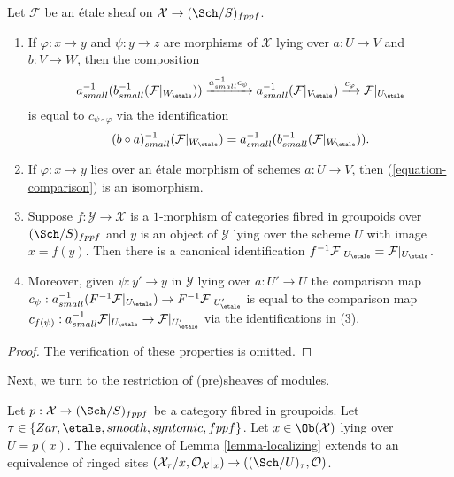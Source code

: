 \begin{lemma}
\label{lemma-comparison}
Let $\mathcal{F}$ be an \'etale sheaf on $\mathcal{X} \to (\Sch/S)_{fppf}$.
\begin{enumerate}
\item If $\varphi : x \to y$ and $\psi : y \to z$
are morphisms of $\mathcal{X}$ lying over $a : U \to V$ and
$b : V \to W$, then the composition
$$
a_{small}^{-1}(b_{small}^{-1} (\mathcal{F}|_{W_\etale}))
\xrightarrow{a_{small}^{-1}c_\psi}
a_{small}^{-1}(\mathcal{F}|_{V_\etale})
\xrightarrow{c_\varphi}
\mathcal{F}|_{U_\etale}
$$
is equal to $c_{\psi \circ \varphi}$ via the identification
$$
(b \circ a)_{small}^{-1}(\mathcal{F}|_{W_\etale}) =
a_{small}^{-1}(b_{small}^{-1} (\mathcal{F}|_{W_\etale})).
$$
\item If $\varphi : x \to y$ lies over an \'etale morphism of schemes
$a : U \to V$, then (\ref{equation-comparison}) is an isomorphism.
\item Suppose $f : \mathcal{Y} \to \mathcal{X}$ is a $1$-morphism of
categories fibred in groupoids over $(\Sch/S)_{fppf}$ and $y$ is
an object of $\mathcal{Y}$ lying over the scheme $U$ with image
$x = f(y)$. Then there is a canonical identification
$f^{-1}\mathcal{F}|_{U_\etale} = \mathcal{F}|_{U_\etale}$.
\item Moreover, given $\psi : y' \to y$ in $\mathcal{Y}$ lying over
$a : U' \to U$ the comparison map
$c_\psi : a_{small}^{-1}(F^{-1}\mathcal{F}|_{U_\etale}) \to
F^{-1}\mathcal{F}|_{U'_\etale}$ is equal to the
comparison map $c_{f(\psi)} : a_{small}^{-1}\mathcal{F}|_{U_\etale}
\to \mathcal{F}|_{U'_\etale}$ via the identifications in (3).
\end{enumerate}
\end{lemma}

\begin{proof}
The verification of these properties is omitted.
\end{proof}

\noindent
Next, we turn to the restriction of (pre)sheaves of modules.

\begin{lemma}
\label{lemma-localizing-structure-sheaf}
Let $p : \mathcal{X} \to (\Sch/S)_{fppf}$ be a category fibred
in groupoids. Let $\tau \in \{Zar, \etale, smooth, syntomic, fppf\}$.
Let $x \in \Ob(\mathcal{X})$ lying over $U = p(x)$.
The equivalence of
Lemma \ref{lemma-localizing}
extends to an equivalence of ringed sites
$(\mathcal{X}_\tau/x, \mathcal{O}_\mathcal{X}|_x) \to
((\Sch/U)_\tau, \mathcal{O})$.
\end{lemma}

